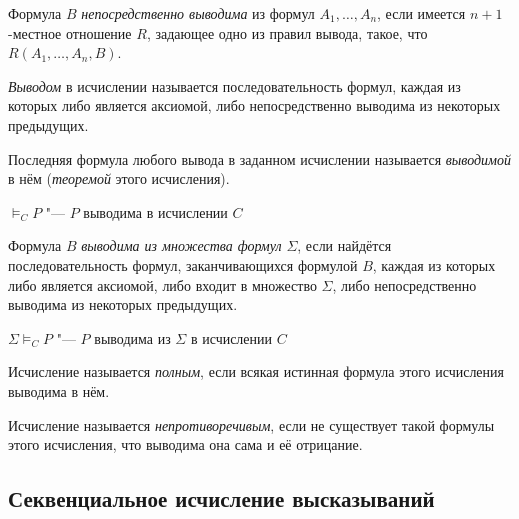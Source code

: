 \begin{definition}
	Формула $ B $ \emph{непосредственно выводима} из формул $ A_1, \dots, A_n $, если имеется $ n + 1 $-местное отношение $ R $, задающее одно из правил вывода, такое, что $ R(A_1, \dots, A_n, B) $.
\end{definition}

\begin{definition}
	\emph{Выводом} в исчислении называется последовательность формул, каждая из которых либо является аксиомой, либо непосредственно выводима из некоторых предыдущих.
\end{definition}

\begin{definition}
	Последняя формула любого вывода в заданном исчислении называется \emph{выводимой} в нём (\emph{теоремой} этого исчисления).
\end{definition}

\begin{notation}
	$ \models_C P $ "--- $ P $ выводима в исчислении $ C $
\end{notation}

\begin{definition}
	Формула $ B $ \emph{выводима из множества формул} $ \Sigma $, если найдётся последовательность формул, заканчивающихся формулой $ B $, каждая из которых либо является аксиомой, либо входит в множество $ \Sigma $, либо непосредственно выводима из некоторых предыдущих.
\end{definition}

\begin{notation}
	$ \Sigma \models_C P $ "--- $ P $ выводима из $ \Sigma $ в исчислении $ C $
\end{notation}

\begin{definition}
	Исчисление называется \emph{полным}, если всякая истинная формула этого исчисления выводима в нём.
\end{definition}

\begin{definition}
	Исчисление называется \emph{непротиворечивым}, если не существует такой формулы этого исчисления, что выводима она сама и её отрицание.
\end{definition}

\subsection{Секвенциальное исчисление высказываний}

